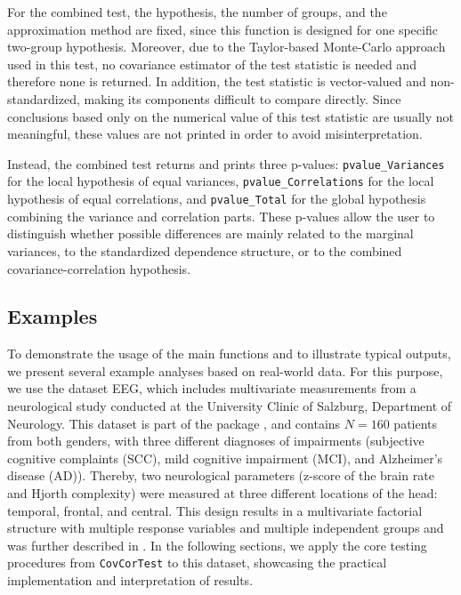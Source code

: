 For the combined test, the hypothesis, the number of groups, and the
approximation method are fixed, since this function is designed for one specific
two-group hypothesis. Moreover, due to the Taylor-based Monte-Carlo approach
used in this test, no covariance estimator of the test statistic is needed and
therefore none is returned. In addition, the test statistic is vector-valued and
non-standardized, making its components difficult to compare directly. Since
conclusions based only on the numerical value of this test statistic are usually
not meaningful, these values are not printed in order to avoid
misinterpretation.

Instead, the combined test returns and prints three p-values:
\texttt{pvalue\_Variances} for the local hypothesis of equal variances,
\texttt{pvalue\_Correlations} for the local hypothesis of equal correlations, and
\texttt{pvalue\_Total} for the global hypothesis combining the variance and correlation
parts. These p-values allow the user to distinguish whether possible differences
are mainly related to the marginal variances, to the standardized dependence
structure, or to the combined covariance-correlation hypothesis.

\subsection{Examples}\label{examples}

To demonstrate the usage of the main functions and to illustrate typical
outputs, we present several example analyses based on real-world data. For this
purpose, we use the dataset EEG, which includes multivariate measurements from
a neurological study conducted at the University Clinic of Salzburg, Department
of Neurology. This dataset is part of the  package
\citep{Friedrich2019}, and contains \(N = 160\) patients from both genders,
with three different diagnoses of impairments (subjective cognitive complaints
(SCC), mild cognitive impairment (MCI), and Alzheimer's disease (AD)). Thereby,
two neurological parameters (z-score of the brain rate and Hjorth complexity)
were measured at three different locations of the head: temporal, frontal, and
central. This design results in a multivariate factorial structure with multiple
response variables and multiple independent groups and was further described in
\citet{bathke2018}. In the following sections, we apply the core testing
procedures from \texttt{CovCorTest} to this dataset, showcasing the practical
implementation and interpretation of results.

